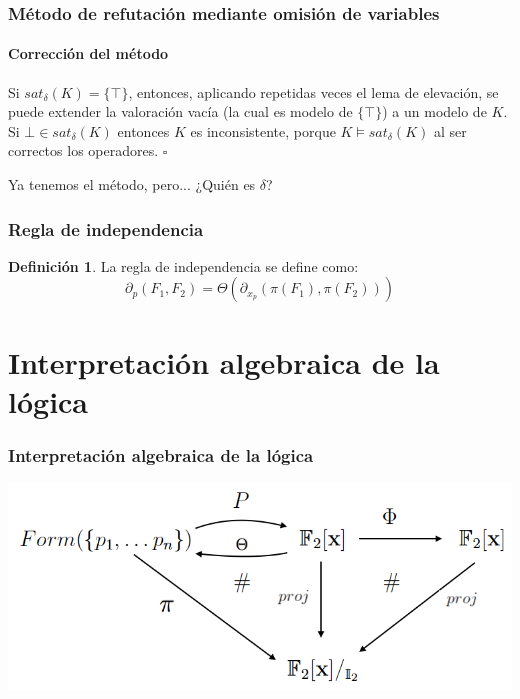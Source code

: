 \documentclass[12pt,a4paper]{beamer}
\theoremstyle{definition}
\newtheorem{defn}[thm]{Definición}
\theoremstyle{remark}
\begin{document}
\begin{frame}
\frametitle{\normalsize{Método de refutación mediante omisión de variables}}
\framesubtitle{Corrección del método}
Si $sat_{\delta} (K) = \{ \top \}$, entonces, aplicando repetidas veces el lema de elevación, se puede extender la valoración vacía (la cual es modelo de $\{ \top \}$) a un modelo de $K$.\\

Si $\bot \in sat_{\delta} (K)$ entonces $K$ es inconsistente, porque $K \vDash sat_{\delta} (K)$ al ser correctos los operadores. \hfill $\square$
\end{frame}

\begin{frame}
\begin{center}
\Huge{Ya tenemos el método, pero...}
\pause
\Huge{¿Quién es $\delta$?}
\end{center}
\end{frame}

\begin{frame}
\frametitle{Regla de independencia}
\begin{defn}
La regla de independencia se define como:
$$\partial_p(F_1,F_2) = \Theta (\partial_{x_p} (\pi (F_1),\pi (F_2)))$$
\end{defn}
\end{frame}

\section{Interpretación algebraica de la lógica}
\begin{frame}
\frametitle{Interpretación algebraica de la lógica}
\vspace{1cm}
\begin{center}
\includegraphics[scale=0.35]{imagenes/conmu.png}
\end{center}
\end{frame}
\end{document}
